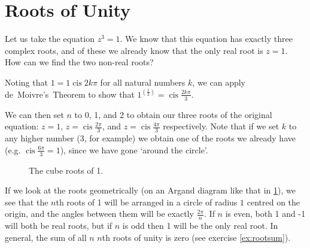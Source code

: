 \documentclass[a4paper,10pt,titlepage]{article}
\theoremstyle{definition}
\DeclareMathOperator{\cis}{cis}
\newcommand*\realp[1]{ \mathfrak{Re} \left ( {#1} \right )  }
\newcommand*\imagp[1]{ \mathfrak{Im} \left ( {#1} \right )  }
\begin{document}
\section{Roots of Unity}\label{sec:roots}
Let us take the equation $ z^3 = 1 $. We know that this equation has exactly three complex
roots, and of these we already know that the only real root is $ z = 1 $. How can we find
the two non-real roots?

Noting that $ 1 = 1 \cis 2k\pi $ for all natural numbers $ k $, we can apply de~Moivre's~Theorem
to show that $ 1^{(\frac{1}{3})} = \cis \frac{2k\pi}{3} $.

We can then set $ n $ to 0, 1, and 2 to obtain our three roots of the original
equation: $ z = 1 $, $ z = \cis \frac{2\pi}{3} $, and $ z = \cis \frac{4\pi}{3} $
respectively. Note that if we set $ k $ to any higher number (3, for example) we
obtain one of the roots we already have (e.g. $ \cis \frac{6\pi}{3} = 1 $), since we
have gone `around the circle'.

\begin{figure}
  \centering
  \caption{The cube roots of 1.\label{fig:cuberoots}}
\end{figure}

If we look at the roots geometrically (on an Argand diagram like that in \cref{fig:cuberoots}), we see that
the $ n$th roots of 1 will be arranged in a circle of radius $ 1 $ centred on the origin, and the
angles between them will be exactly $ \frac{2\pi}{n} $. If $ n $ is even, both 1 and -1 will both
be real roots, but if $ n $ is odd then 1 will be the only real root. In general, the sum of all
$ n $ $n$th roots of unity is zero (see exercise \ref{ex:rootsum}).
\end{document}
